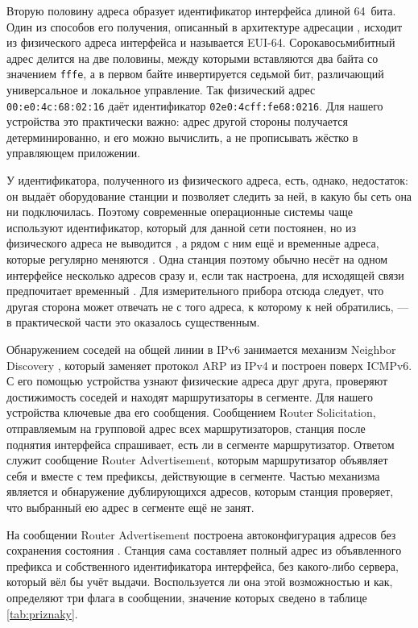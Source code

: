 Вторую половину адреса образует идентификатор интерфейса длиной 64~бита. Один из способов его получения, описанный в архитектуре адресации \cite{rfc4291}, исходит из физического адреса интерфейса и называется EUI-64. Сорокавосьмибитный адрес делится на две половины, между которыми вставляются два байта со значением \texttt{fffe}, а в первом байте инвертируется седьмой бит, различающий универсальное и локальное управление. Так физический адрес \texttt{00:e0:4c:68:02:16} даёт идентификатор \texttt{02e0:4cff:fe68:0216}. Для нашего устройства это практически важно: адрес другой стороны получается детерминированно, и его можно вычислить, а не прописывать жёстко в управляющем приложении.

У идентификатора, полученного из физического адреса, есть, однако, недостаток: он выдаёт оборудование станции и позволяет следить за ней, в какую бы сеть она ни подключилась. Поэтому современные операционные системы чаще используют идентификатор, который для данной сети постоянен, но из физического адреса не выводится \cite{rfc7217}, а рядом с ним ещё и временные адреса, которые регулярно меняются \cite{rfc8981}. Одна станция поэтому обычно несёт на одном интерфейсе несколько адресов сразу и, если так настроена, для исходящей связи предпочитает временный \cite{rfc8981}. Для измерительного прибора отсюда следует, что другая сторона может отвечать не с того адреса, к которому к ней обратились, — в практической части это оказалось существенным.

Обнаружением соседей на общей линии в IPv6 занимается механизм Neighbor Discovery \cite{rfc4861}, который заменяет протокол ARP из IPv4 и построен поверх ICMPv6. С его помощью устройства узнают физические адреса друг друга, проверяют достижимость соседей и находят маршрутизаторы в сегменте. Для нашего устройства ключевые два его сообщения. Сообщением Router Solicitation, отправляемым на групповой адрес всех маршрутизаторов, станция после поднятия интерфейса спрашивает, есть ли в сегменте маршрутизатор. Ответом служит сообщение Router Advertisement, которым маршрутизатор объявляет себя и вместе с тем префиксы, действующие в сегменте. Частью механизма является и обнаружение дублирующихся адресов, которым станция проверяет, что выбранный ею адрес в сегменте ещё не занят.

На сообщении Router Advertisement построена автоконфигурация адресов без сохранения состояния \cite{rfc4862}. Станция сама составляет полный адрес из объявленного префикса и собственного идентификатора интерфейса, без какого-либо сервера, который вёл бы учёт выдачи. Воспользуется ли она этой возможностью и как, определяют три флага в сообщении, значение которых сведено в таблице \ref{tab:priznaky}.

